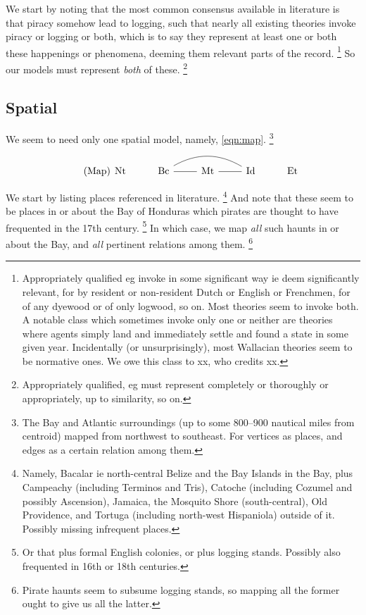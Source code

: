 	We start by noting that the most common consensus available in literature is that piracy somehow lead to logging, such that nearly all existing theories invoke piracy or logging or both, which is to say they represent at least one or both these happenings or phenomena, deeming them relevant parts of the record.%
	\footnote{Appropriately qualified eg invoke in some significant way ie deem significantly relevant, for  by resident or non-resident Dutch or English or Frenchmen, for  of any dyewood or of only logwood, so on. Most theories seem to invoke both. A notable class which sometimes invoke only one or neither are  theories where agents simply land and immediately settle and found a state in some given year. Incidentally (or unsurprisingly), most Wallacian theories seem to be normative ones. We owe this class to xx, who credits xx.}
	So our models must represent \emph{both} of these.%
	\footnote{Appropriately qualified, eg must represent completely or thoroughly or appropriately, up to similarity, so on.}
	\subsection{Spatial}
	\label{ss:spatial}
		We seem to need only one spatial model, namely, \ref{eqn:map}.%
		\footnote{The Bay and Atlantic surroundings (up to some 800--900 nautical miles from centroid) mapped from northwest to southeast. For vertices as places, and edges as a certain relation among them. }
		\begin{equation}
		\tag{Map}
		\label{eqn:map}
		\begin{tikzcd}[arrows=dash]
		\nt &\bc \rar \ar[rr,bend left] &\mt \rar &\id &\et
		\end{tikzcd}
		\end{equation}
	
		We start by listing places referenced in literature.%
		\footnote{Namely, Bacalar ie north-central Belize and the Bay Islands in the Bay, plus Campeachy (including Terminos and Tris), Catoche (including Cozumel and possibly Ascension), Jamaica, the Mosquito Shore (south-central), Old Providence, and Tortuga (including north-west Hispaniola) outside of it. Possibly missing infrequent places.}
		And note that these seem to be places in or about the Bay of Honduras which pirates are thought to have frequented in the 17th century.%
		\footnote{Or that plus formal English colonies, or plus logging stands. Possibly also frequented in 16th or 18th centuries.}
		In which case, we map \emph{all} such haunts in or about the Bay, and \emph{all} pertinent relations among them.%
		\footnote{Pirate haunts seem to subsume logging stands, so mapping all the former ought to give us all the latter.}
	
